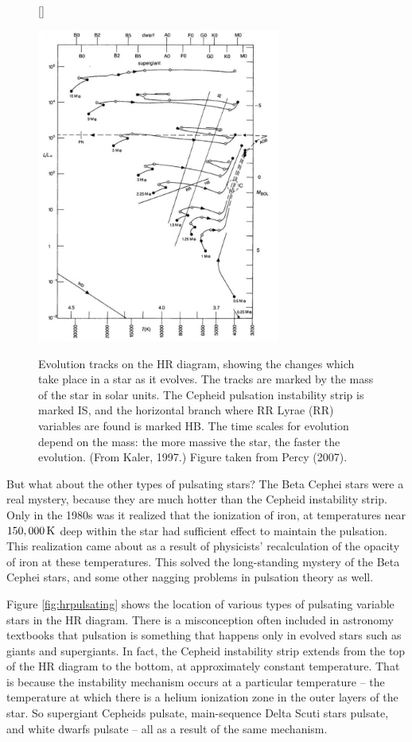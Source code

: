 \documentclass[a4paper,10pt]{article}
\begin{document}
\begin{figure}[t!]
    [\FBwidth]
    {\caption{\footnotesize{Evolution tracks on the HR diagram, showing the changes which take place in a star as it evolves. The tracks are marked by the mass of the star in solar units. The Cepheid pulsation instability strip is marked IS, and the horizontal branch where RR Lyrae (RR) variables are found is marked HB. The time scales for evolution depend on the mass: the more massive the star, the faster the evolution. (From Kaler, 1997.) Figure taken from Percy (2007).}}
    \label{fig:inststripevol}}
    {\includegraphics[width=8cm]{figures/InstStripEvol.png}}
\end{figure}

{\noindent}But what about the other types of pulsating stars? The Beta Cephei stars were a real mystery, because they are much hotter than the Cepheid instability strip. Only in the 1980s was it realized that the ionization of iron, at temperatures near $150,000\,{\rm K}$ deep within the star had sufficient effect to maintain the pulsation. This realization came about as a result of physicists' recalculation of the opacity of iron at these temperatures. This solved the long-standing mystery of the Beta Cephei stars, and some other nagging problems in pulsation theory as well.

{\noindent}Figure \ref{fig:hrpulsating} shows the location of various types of pulsating variable stars in the HR diagram. There is a misconception often included in astronomy textbooks that pulsation is something that happens only in evolved stars such as giants and supergiants. In fact, the Cepheid instability strip extends from the top of the HR diagram to the bottom, at approximately constant temperature. That is because the instability mechanism occurs at a particular temperature -- the temperature at which there is a helium ionization zone in the outer layers of the star. So supergiant Cepheids pulsate, main-sequence Delta Scuti stars pulsate, and white dwarfs pulsate -- all as a result of the same mechanism.
\end{document}

